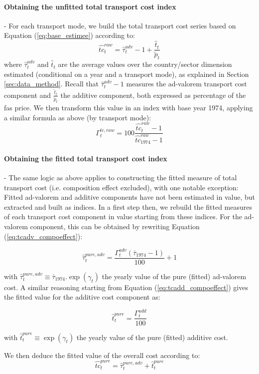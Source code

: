 \documentclass[a4paper,11pt]{article}
\begin{document}
\paragraph{Obtaining the unfitted total transport cost index} - For each transport mode, we build the total transport cost series based on Equation (\ref{eq:base_estimee}) according to:
$$\widehat{tc}^{raw}_t= \widehat{\tau}^{adv}_t -1 + \frac{\widehat{t}_t}{\widetilde{p}_t}$$
\noindent where $\widehat{\tau}^{adv}_t$ and $\widehat{t}_t$ are the average values over the country/sector dimension estimated (conditional on a year and a transport mode), as explained in Section \ref{sec:data_method}.
Recall that $\widehat{\tau}^{adv}_t-1$ measures the ad-valorem transport cost component and $\frac{\widehat{t}_t}{\widetilde{p}_t}$ the additive component, both expressed as percentage of the fas price.
We then transform this value in an index with base year 1974, applying a similar formula as above (by transport mode):
$$\Gamma^{tc, raw}_t = 100\frac{\widehat{tc}^{raw}_t -1 }{\widehat{tc}^{raw}_{1974}-1}$$

\paragraph{Obtaining the fitted total transport cost index} - The same logic as above applies to constructing the fitted measure of total transport cost (i.e. composition effect excluded), with one notable exception: Fitted ad-valorem and additive components have not been estimated in value, but extracted and built as indices.
In a first step then, we rebuild the fitted measures of each transport cost component in value starting from these indices.
For the ad-valorem component, this can be obtained by rewriting Equation (\ref{eq:tcadv_compoeffect}):

$$\widehat{\tau}^{pure, adv}_t = \frac{\Gamma^{adv}_t \left(\bar{\tau}_{1974}-1\right)}{100} +1$$

with $\widehat{\tau}^{pure, adv}_t \equiv \bar{\tau}_{1974}.\exp(\gamma_t)$ the yearly value of the pure (fitted) ad-valorem cost.
A similar reasoning starting from Equation (\ref{eq:tcadd_compoeffect}) gives the fitted value for the additive cost component as:

$$\widehat{t}^{pure}_t = \frac{\Gamma^{add}_t}{100}$$

with $\widehat{t}^{pure}_t \equiv \exp(\gamma_t)$ the yearly value of the pure (fitted) additive cost.


We then deduce the fitted value of the overall cost according to:
$$\widehat{tc}^{pure}_t= \widehat{\tau}^{pure, adv}_t  + \widehat{t}^{pure}_t$$
\end{document}
